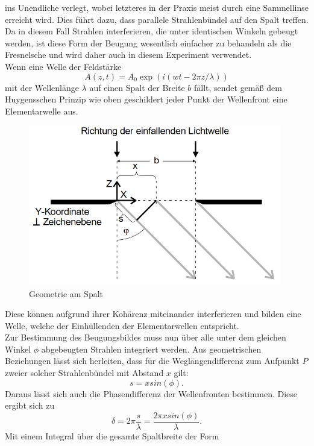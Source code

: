 ins Unendliche verlegt, wobei letzteres in der Praxis meist durch eine Sammellinse erreicht wird. Dies führt dazu, dass parallele Strahlenbündel
auf den Spalt treffen. Da in diesem Fall Strahlen interferieren, die unter identischen Winkeln gebeugt werden, ist diese Form der Beugung wesentlich 
einfacher zu behandeln als die Fresnelsche und wird daher auch in diesem Experiment verwendet. \\
Wenn eine Welle der Feldstärke
\begin{equation}
A(z,t)=A_0\exp(i(wt-2\pi z/\lambda))
\end{equation}
mit der Wellenlänge $\lambda$ auf einen Spalt der Breite $b$ fällt, sendet gemäß dem Huygensschen Prinzip wie oben geschildert jeder Punkt der Wellenfront
eine Elementarwelle aus.
\begin{figure} [h]
    \centering
    \includegraphics[height=7cm, keepaspectratio]{Spalt geometrie}
    \caption{Geometrie am Spalt}
 \end{figure}
Diese können aufgrund ihrer Kohärenz miteinander interferieren und bilden eine Welle, welche der Einhüllenden der Elementarwellen 
entspricht. \\ Zur Bestimmung des Beugungsbildes muss nun über alle unter dem gleichen Winkel $\phi$ abgebeugten Strahlen 
integriert werden. Aus geometrischen Beziehungen lässt sich herleiten, dass für die Weglängendifferenz zum Aufpunkt $P$ zweier solcher Strahlenbündel mit Abstand $x$ gilt:
\begin{equation}
s=xsin(\phi).
\end{equation}
Daraus lässt sich auch die Phasendifferenz der Wellenfronten bestimmen. Diese ergibt sich zu
\begin{equation}
\delta=2\pi\frac{s}{\lambda}=\frac{2\pi xsin(\phi)}{\lambda}.
\end{equation}
Mit einem Integral über die gesamte Spaltbreite der Form
